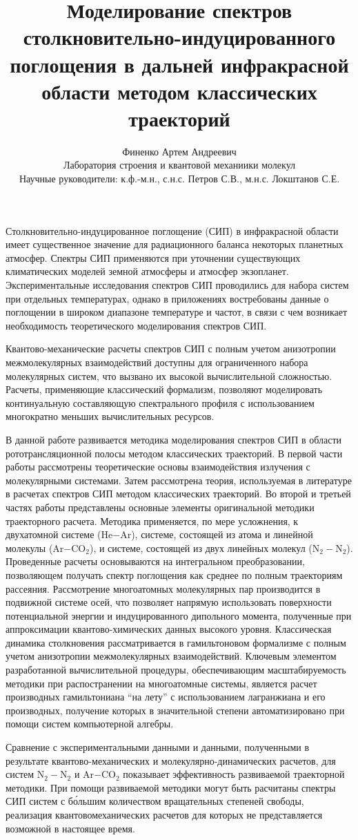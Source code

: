 \documentclass[12pt]{article}
\title{Моделирование спектров столк\-но\-ви\-тель\-но-ин\-ду\-ци\-ро\-ван\-ного поглощения в дальней инфракрасной области методом классических траекторий}
\date{}
\author{Финенко Артем Андреевич \\ Лаборатория строения и квантовой механиики молекул \\ Научные руководители: к.ф.-м.н., с.н.с. Петров С.В., м.н.с. Локштанов С.Е.}
\begin{document}
\maketitle
\vspace*{-1.5cm}
Столкновительно-индуцированное поглощение (СИП) в инфракрасной области имеет существенное значение для радиационного баланса некоторых планетных атмосфер. Спектры СИП применяются при уточнении существующих климатических моделей земной атмосферы и атмосфер экзопланет. Экспериментальные исследования спектров СИП проводились для набора систем при отдельных температурах, однако в приложениях востребованы данные о поглощении в широком диапазоне температуре и частот, в связи с чем возникает необходимость теоретического моделирования спектров СИП. \par
Квантово-механические расчеты спектров СИП с полным учетом анизотропии межмолекулярных взаимодействий доступны для ограниченного набора молекулярных систем, что вызвано их высокой вычислительной сложностью. Расчеты, применяющие классический формализм, позволяют моделировать континуальную составляющую спектрального профиля с использованием многократно меньших вычислительных ресурсов. \par  
В данной работе развивается методика моделирования спектров СИП в области рототрансляционной полосы методом классических траекторий. В первой части работы рассмотрены теоретические основы взаимодействия излучения с молекулярными системами. Затем рассмотрена теория, используемая в литературе в расчетах спектров СИП методом классических траекторий. Во второй и третьей частях работы представлены основные элементы оригинальной методики траекторного расчета. Методика применяется, по мере усложнения, к двухатомной системе (He$-$Ar), системе, состоящей из атома и линейной молекулы (Ar$-$CO$_2$), и системе, состоящей из двух линейных молекул (N$_2-$N$_2$). Проведенные расчеты основываются на интегральном преобразовании, позволяющем получать спектр поглощения как среднее по полным траекториям рассеяния. Рассмотрение многоатомных молекулярных пар производится в подвижной системе осей, что позволяет напрямую использовать поверхности потенциальной энергии и индуцированного дипольного момента, полученные при аппроксимации квантово-химических данных высокого уровня. Классическая динамика столкновения рассматривается в гамильтоновом формализме с полным учетом анизотропии межмолекулярных взаимодействий. Ключевым элементом разработанной вычислительной процедуры, обеспечивающим масштабируемость методики при распостранении на многоатомные системы, является расчет производных гамильтониана \enquote{на лету} с использованием лагранжиана и его производных, получение которых в значительной степени автоматизировано при помощи систем компьютерной алгебры. \par 
Сравнение с экспериментальными данными и данными, полученными в результате кван\-тово-механических и молекулярно-динамических расчетов, для систем N$_2-$N$_2$ и Ar$-$CO$_2$ показывает эффективность развиваемой траекторной методики. При помощи развиваемой методики могут быть расчитаны спектры СИП систем с б\'{о}льшим количеством вращательных степеней свободы, реализация квантовомеханических расчетов для которых не представляется возможной в настоящее время.  
\end{document}
